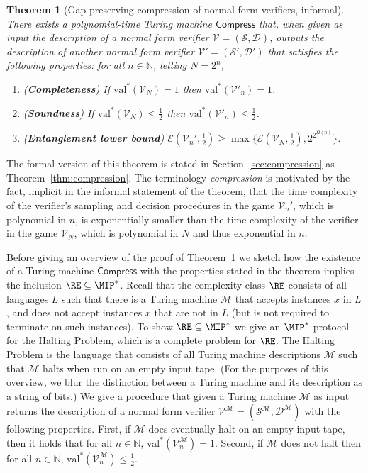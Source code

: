 \documentclass[11pt]{article}
\newtheorem{theorem}{Theorem}[section]
\theoremstyle{definition}
\newcommand{\N}{\ensuremath{\mathbb{N}}}
\newcommand{\val}{\ensuremath{\mathrm{val}}}
\newcommand{\sampler}{\mathcal{S}}
\newcommand{\decider}{\mathcal{D}}
\newcommand{\verifier}{\mathcal{V}}
\newcommand{\Ent}{\mathscr{E}}
\newcommand{\machine}{\cal{M}}
\renewcommand{\cal}[1]{\mathcal{#1}}
\newcommand{\tmstyle}[1]{\ensuremath{\mathsf{#1}}}
\newcommand{\Compress}{\tmstyle{Compress}}
\begin{document}
\begin{theorem}[Gap-preserving compression of normal form verifiers, informal]
\label{thm:compression-informal}
There exists a polynomial-time Turing machine $\Compress$ that, when given as input the description of a normal form verifier $\verifier = (\sampler,\decider)$, outputs the description of another normal form verifier $\verifier' = (\sampler',\decider')$ that satisfies the following properties: for all $n \in \N$, letting $N = 2^n$,
\begin{enumerate}
\item (\textbf{Completeness}) If $\val^*(\verifier_N) = 1$ then $\val^*(\verifier'_n) = 1$.
\item (\textbf{Soundness}) If $\val^*(\verifier_N) \leq \frac{1}{2}$ then $\val^*(\verifier'_n) \leq \frac{1}{2}$.
\item (\textbf{Entanglement lower bound}) $\Ent(\verifier_n',\frac{1}{2}) \geq \max \{ \Ent(\verifier_N,\frac{1}{2}), 2^{2^{\Omega(n)}} \}$. 
\end{enumerate}
\end{theorem}
\noindent The formal version of this theorem is stated in Section~\ref{sec:compression} as Theorem~\ref{thm:compression}. The terminology \emph{compression} is motivated by the fact, implicit in the informal statement of the theorem, that the time complexity of the verifier's sampling and decision procedures in the game $\verifier_n'$, which is polynomial in $n$, is exponentially smaller than the time complexity of the verifier in the game $\verifier_N$, which is polynomial in $N$ and thus exponential in $n$. 

Before giving an overview of the proof of Theorem~\ref{thm:compression-informal} we sketch how the existence of a Turing machine $\Compress$ with the properties stated in the theorem implies the inclusion $\RE\subseteq \MIP^*$. Recall that the complexity class $\RE$ consists of all languages $L$ such that there is a Turing machine $\cal{M}$ that accepts instances $x$ in $L$, and does not accept instances $x$ that are not in $L$ (but is not required to terminate on such instances). To show $\RE \subseteq \MIP^*$ we give an $\MIP^*$ protocol for the Halting Problem, which is a complete problem for $\RE$. The Halting Problem is the language that consists of all Turing machine descriptions $\cal{M}$ such that $\cal{M}$ halts when run on an empty input tape. (For the purposes of this overview, we blur the distinction between a Turing machine and its description as a string of bits.) We give a procedure that given a Turing machine $\cal{M}$ as input returns the description of a normal form verifier $\verifier^{\cal{M}} = (\sampler^\machine,\decider^\machine)$ with the following properties. First, if $\cal{M}$ does eventually halt on an empty input tape, then it holds that for all $n \in \N$, $\val^*(\verifier^{\cal{M}}_n) = 1$. Second, if $\cal{M}$ does not halt then for all $n \in \N$, $\val^*(\verifier^{\cal{M}}_n) \leq \frac{1}{2}$. 
\end{document}
